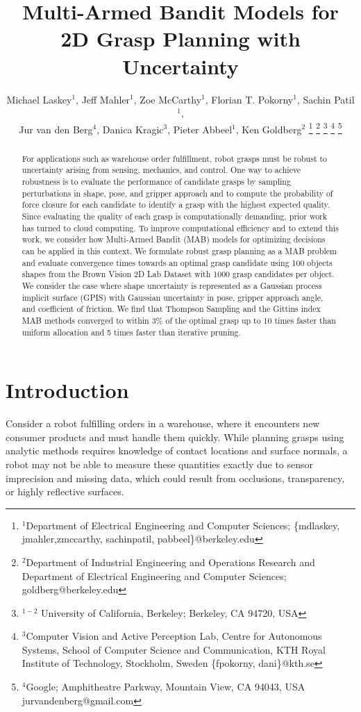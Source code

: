 \documentclass[10pt, conference]{ieeeconf}      %
\title{\LARGE \bf
Multi-Armed Bandit Models for 2D Grasp Planning with Uncertainty}
\author{Michael Laskey$^1$, Jeff Mahler$^1$, Zoe McCarthy$^1$,  Florian T. Pokorny$^1$, Sachin Patil$^1$,\\ Jur van den Berg$^4$,  Danica Kragic$^3$, Pieter Abbeel$^1$, Ken Goldberg$^2$%
\thanks{$^1$Department of Electrical Engineering and Computer Sciences; {\small \{mdlaskey, jmahler,zmccarthy, sachinpatil, pabbeel\}@berkeley.edu}}%
\thanks{$^2$Department of Industrial Engineering and Operations Research and Department of Electrical Engineering and Computer Sciences; {\small goldberg@berkeley.edu}}%
\thanks{$^{1-2}$ University of California, Berkeley;  Berkeley, CA 94720, USA}%
\thanks{$^3$Computer Vision and Active Perception Lab, Centre for Autonomous Systems, School of Computer Science and Communication, KTH Royal Institute of Technology, Stockholm, Sweden {\small \{fpokorny, dani\}@kth.se}}%
\thanks{$^4$Google; Amphitheatre Parkway, Mountain View, CA 94043, USA {\small jurvandenberg@gmail.com}}%
}
\begin{document}
\maketitle
\thispagestyle{empty}
\pagestyle{empty}



\begin{abstract}
For applications such as warehouse order fulfillment, robot grasps must be robust to uncertainty arising from sensing,
mechanics, and control.  One way to achieve robustness is to evaluate the performance of candidate grasps by sampling
perturbations in shape, pose, and gripper approach and to compute the probability of force closure for each candidate to
identify a grasp with the highest expected quality. Since evaluating the
quality of each grasp is computationally demanding, prior work has turned to cloud computing. To improve computational efficiency and to extend this work, we consider how
Multi-Armed Bandit (MAB) models for optimizing decisions can be applied in this context. We formulate robust grasp
planning as a MAB problem and evaluate convergence times towards an optimal grasp candidate using 100 objects shapes from
the Brown Vision 2D Lab Dataset with 1000 grasp candidates per object. We consider the case where shape uncertainty is represented as a Gaussian process implicit surface (GPIS) with Gaussian uncertainty in pose, gripper approach angle, and coefficient of friction. 
We find that Thompson Sampling and the Gittins index MAB methods converged to within 3\% of the optimal grasp up to 10
times faster than uniform allocation and 5 times faster than iterative pruning. 
\end{abstract}



\section{Introduction}



Consider a robot fulfilling orders in a warehouse, where it encounters new consumer products and must handle them quickly.
While planning grasps using analytic methods requires knowledge of contact locations and surface normals,
a robot may not be able to measure these quantities exactly due to sensor imprecision and missing data, which could result from occlusions, transparency, or highly reflective surfaces. 
\end{document}
